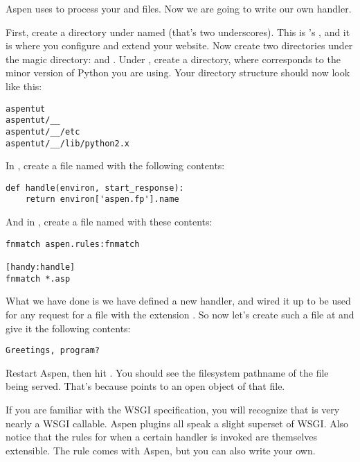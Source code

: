 Aspen uses  to process your  and 
files. Now we are going to write our own handler.

First, create a directory under  named \file{__} (that's two
underscores). This is 's , and it is where
you configure and extend your website. Now create two directories under the
magic directory:  and . Under , create a
 directory, where  corresponds to the minor version of
Python you are using. Your directory structure should now look like this:

\begin{verbatim}
aspentut
aspentut/__
aspentut/__/etc
aspentut/__/lib/python2.x
\end{verbatim}

In , create a file named  with the
following contents:

\begin{verbatim}
def handle(environ, start_response):
    return environ['aspen.fp'].name
\end{verbatim}

And in , create a file named  with these
contents:

\begin{verbatim}
fnmatch aspen.rules:fnmatch

[handy:handle]
fnmatch *.asp
\end{verbatim}

What we have done is we have defined a new handler, and wired it up to be used
for any request for a file with the extension . So now let's create
such a file at  and give it the following contents:

\begin{verbatim}
Greetings, program?
\end{verbatim}

Restart Aspen, then hit . You should see
the filesystem pathname of the file being served. That's because
 points to an open  object of that file.

If you are familiar with the WSGI specification, you will recognize that
 is very nearly a WSGI callable. Aspen plugins all speak
a slight superset of WSGI. Also notice that the rules for when a certain handler
is invoked are themselves extensible. The  rule comes with Aspen,
but you can also write your own.


